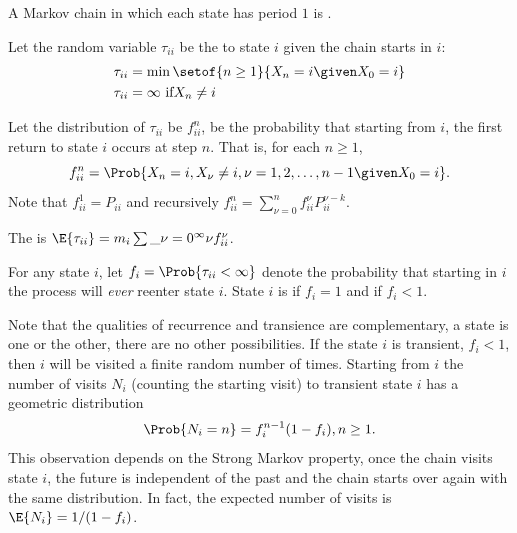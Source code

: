 \documentclass[12pt]{article}
\begin{document}
\begin{definition}
    A Markov chain in which each state has period \( 1 \) is .
\end{definition}

\begin{definition}
    Let the random variable \( \tau_{ii} \) be the  to
    state \( i \) given the chain starts in \( i \):
    \begin{align*}
        \tau_{ii} &= \min\setof{n \ge 1}{X_n = i \given X_0 = i} \\
        \tau_{ii} &= \infty \text{ if} X_n \ne i
    \end{align*}
\end{definition}

\begin{definition}
    Let the distribution of \( \tau_{ii} \) be \( f^n_{ii} \), be the
    probability that starting from \( i \), the first return to state \(
    i \) occurs at step \( n \).  That is, for each \( n \ge 1 \),
    \[
        f^n_{ii} = \Prob{X_n = i, X_\nu \ne i, \nu =1,2,\dots,n-1 \given
        X_0 = i}.
    \] Note that \( f^1_{ii} = P_{ii} \) and recursively \( f^n_{ii} =
    \sum_{\nu=0}^n f^{\nu}_{ii} P^{\nu-k}_{ii} \).
\end{definition}

\begin{definition}
    The  is \( \E{\tau_{ii}} = m_i \sum\_{\nu=0}^
    {\infty} \nu f^\nu_{ii} \).
\end{definition}

\begin{definition}
    For any state \( i \), let \( f_i = \Prob{\tau_{ii} < \infty} \)
    denote the probability that starting in \( i \) the process will
    \emph{ever} reenter state \( i \). State \( i \) is 
    if \( f_i = 1 \) and  if \( f_{i} < 1 \).
\end{definition}

\begin{remark}
    Note that the qualities of recurrence and transience are
    complementary, a state is one or the other, there are no other
    possibilities. If the state \( i \) is transient, \( f_i < 1 \),
    then \( i \) will be visited a finite random number of times.
    Starting from \( i \) the number of visits \( N_i \) (counting the
    starting visit) to transient state \( i \) has a geometric
    distribution
    \[
        \Prob{N_i = n} = f_i^{n-1}(1 - f_i), n \ge 1.
    \] This observation depends on the Strong Markov property, once the
    chain visits state \( i \), the future is independent of the past
    and the chain starts over again with the same distribution.  In
    fact, the expected number of visits is \( \E{N_i} = 1/(1 - f_i) \).
\end{remark}
\end{document}
